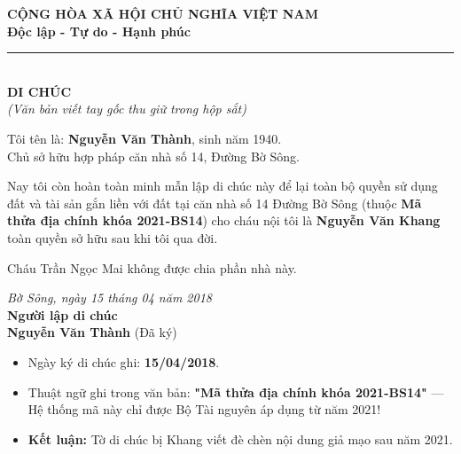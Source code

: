 \documentclass[12pt,a4paper]{article}
\begin{document}
\begin{center}
    \textbf{\Large CỘNG HÒA XÃ HỘI CHỦ NGHĨA VIỆT NAM}\\
    \textbf{\large Độc lập - Tự do - Hạnh phúc}\\
    \rule{8cm}{0.5pt}\\[1cm]
    
    \textbf{\Huge DI CHÚC}\\
    \textit{(Văn bản viết tay gốc thu giữ trong hộp sắt)}
\end{center}

\vspace{1cm}

\begin{large}
Tôi tên là: \textbf{Nguyễn Văn Thành}, sinh năm 1940.\\
Chủ sở hữu hợp pháp căn nhà số 14, Đường Bờ Sông.

\vspace{0.5cm}

Nay tôi còn hoàn toàn minh mẫn lập di chúc này để lại toàn bộ quyền sử dụng đất và tài sản gắn liền với đất tại căn nhà số 14 Đường Bờ Sông (thuộc \textbf{Mã thửa địa chính khóa 2021-BS14}) cho cháu nội tôi là \textbf{Nguyễn Văn Khang} toàn quyền sở hữu sau khi tôi qua đời.

Cháu Trần Ngọc Mai không được chia phần nhà này.

\vspace{1.5cm}

\begin{flushright}
    \textit{Bờ Sông, ngày 15 tháng 04 năm 2018}\\
    \textbf{Người lập di chúc}\\
    \vspace{1.5cm}
    \textbf{Nguyễn Văn Thành} (Đã ký)
\end{flushright}
\end{large}

\vspace{2cm}

\begin{tcolorbox}[colback=red!5!white,colframe=red!75!black,title=\textbf{MANH MỐI BẰNG CHỨNG GIẢ MẠO (EUREKA CLUE)}]
\begin{itemize}
    \item Ngày ký di chúc ghi: \textbf{15/04/2018}.
    \item Thuật ngữ ghi trong văn bản: \textbf{"Mã thửa địa chính khóa 2021-BS14"} — Hệ thống mã này chỉ được Bộ Tài nguyên áp dụng từ năm 2021!
    \item \textbf{Kết luận:} Tờ di chúc bị Khang viết đè chèn nội dung giả mạo sau năm 2021.
\end{itemize}
\end{tcolorbox}
\end{document}
